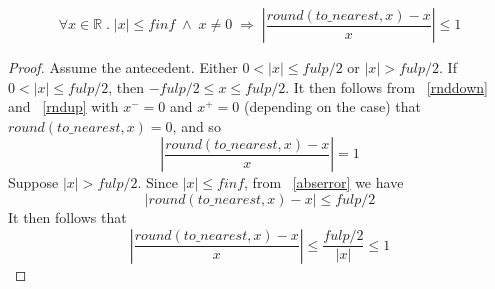 \documentclass{article}
\begin{document}
\begin{thm}
\label{relerror}
\begin{equation*}
\forall x \in \mathbb{R} \; . \; |x| \leq finf \; \wedge \; x \neq 0 \;
\Longrightarrow \;
\left | \frac{round(to\_nearest, x) - x}{x} \right | \leq 1
\end{equation*}
\begin{proof} Assume the antecedent. Either $0 < |x| \leq fulp/2$ or 
$|x| > fulp/2$. If $0 < |x| \leq fulp/2$, then $-fulp/2 \leq x \leq fulp/2$.
It then follows from ~\ref{rnddown} and ~\ref{rndup} with $x^- = 0$ and
$x^+ = 0$ (depending on the case) that $round(to\_nearest,x) = 0$, and so
\begin{equation*}
\left | \frac{round(to\_nearest, x) - x}{x} \right | = 1
\end{equation*}
Suppose $|x| > fulp/2$. Since $|x| \leq finf$, from
~\ref{abserror} we have
\begin{equation*}
\left | round(to\_nearest, x) - x \right | \leq fulp/2
\end{equation*}
It then follows that
\begin{equation*}
\left | \frac{round(to\_nearest, x) - x}{x} \right | 
\leq \frac{fulp/2}{|x|} \leq 1
\end{equation*}
\end{proof}
\end{thm}
\end{document}
